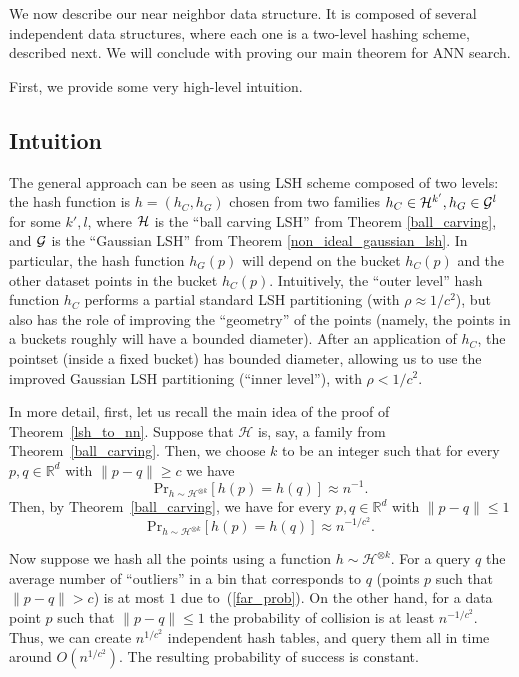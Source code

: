 \documentclass[11pt,letterpaper]{article}
\newcommand{\Rbb}{\mathbb{R}}
\begin{document}
We now describe our near neighbor data structure. It is composed of
several independent data structures, where each one is a two-level
hashing scheme, described next. We will conclude with proving our main
theorem for ANN search.

First, we provide some very high-level intuition.

\subsection*{Intuition}

The general approach can be seen as using LSH scheme composed of two
levels: the hash function is $h=(h_C, h_G)$ chosen from two families
$h_C\in {\cal H}^{k'}, h_G\in {\cal G}^l$ for some $k',l$, where $\cal
H$ is the ``ball carving LSH'' from Theorem \ref{ball_carving}, and
$\cal G$ is the ``Gaussian LSH'' from Theorem
\ref{non_ideal_gaussian_lsh}. In particular, the hash function
$h_G(p)$ will depend on the bucket $h_C(p)$ and the other dataset
points in the bucket $h_C(p)$. Intuitively, the ``outer level'' hash
function $h_C$ performs a partial standard LSH partitioning (with $\rho\approx
1/c^2$), but also has the role of improving the ``geometry'' of the
points (namely, the points in a buckets roughly will have a bounded
diameter). After an application of $h_C$, the
pointset (inside a fixed bucket) has bounded diameter, allowing us to
use the improved Gaussian LSH partitioning (``inner level''), with
$\rho<1/c^2$.

In more detail, first, let us recall the main idea of the proof of
Theorem~\ref{lsh_to_nn}.  Suppose that $\mathcal{H}$ is, say, a family
from Theorem~\ref{ball_carving}.  Then, we choose $k$ to be an integer
such that for every $p, q \in \Rbb^d$ with $\|p - q\| \geq c$ we
have
\begin{equation}
    \label{far_prob}
    \mathrm{Pr}_{h \sim \mathcal{H}^{\otimes k}}[h(p) = h(q)] \approx n^{-1}.
\end{equation}
Then, by Theorem~\ref{ball_carving}, we have for every $p, q \in \Rbb^d$ with
$\|p - q\| \leq 1$
$$
    \mathrm{Pr}_{h \sim \mathcal{H}^{\otimes k}}[h(p) = h(q)] \approx n^{-1/c^2}.
$$ 

Now suppose we hash all the points using a function $h \sim
\mathcal{H}^{\otimes k}$.  For a query $q$ the average number of
``outliers'' in a bin that corresponds to $q$ (points $p$ such that
$\|p - q\| > c$) is at most $1$ due to~(\ref{far_prob}).  On the other
hand, for a data point $p$ such that $\|p - q\| \leq 1$ the
probability of collision is at least $n^{-1 / c^2}$.  Thus, we can
create $n^{1/c^2}$ independent hash tables, and query them all in time
around $O(n^{1/c^2})$.  The resulting probability of success is
constant.
\end{document}
